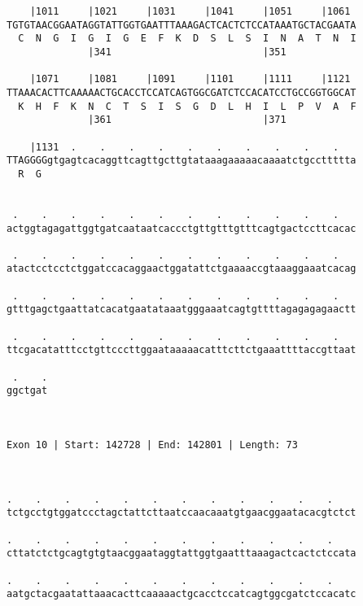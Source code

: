 \documentclass{article}
\begin{document}
\begin{Verbatim}
    |1011     |1021     |1031     |1041     |1051     |1061 
TGTGTAACGGAATAGGTATTGGTGAATTTAAAGACTCACTCTCCATAAATGCTACGAATA
  C  N  G  I  G  I  G  E  F  K  D  S  L  S  I  N  A  T  N  I
              |341                          |351            
  
    |1071     |1081     |1091     |1101     |1111     |1121 
TTAAACACTTCAAAAACTGCACCTCCATCAGTGGCGATCTCCACATCCTGCCGGTGGCAT
  K  H  F  K  N  C  T  S  I  S  G  D  L  H  I  L  P  V  A  F
              |361                          |371            
  
    |1131  .    .    .    .    .    .    .    .    .    .   
TTAGGGGgtgagtcacaggttcagttgcttgtataaagaaaaacaaaatctgccttttta
  R  G                                                      
                                                            
  
 .    .    .    .    .    .    .    .    .    .    .    .   
actggtagagattggtgatcaataatcaccctgttgtttgtttcagtgactccttcacac
                                                            
 .    .    .    .    .    .    .    .    .    .    .    .   
atactcctcctctggatccacaggaactggatattctgaaaaccgtaaaggaaatcacag
                                                            
 .    .    .    .    .    .    .    .    .    .    .    .   
gtttgagctgaattatcacatgaatataaatgggaaatcagtgttttagagagagaactt
                                                            
 .    .    .    .    .    .    .    .    .    .    .    .   
ttcgacatatttcctgttcccttggaataaaaacatttcttctgaaattttaccgttaat
                                                            
 .    .
ggctgat
       
       
 
Exon 10 | Start: 142728 | End: 142801 | Length: 73



.    .    .    .    .    .    .    .    .    .    .    .    
tctgcctgtggatccctagctattcttaatccaacaaatgtgaacggaatacacgtctct
                                                            
.    .    .    .    .    .    .    .    .    .    .    .    
cttatctctgcagtgtgtaacggaataggtattggtgaatttaaagactcactctccata
                                                            
.    .    .    .    .    .    .    .    .    .    .    .    
aatgctacgaatattaaacacttcaaaaactgcacctccatcagtggcgatctccacatc
                                                            

\end{Verbatim}
\end{document}
